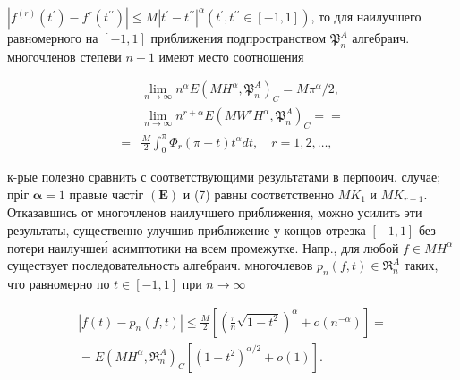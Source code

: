 \documentclass[10pt]{article}
\begin{document}
$\left|f^{(r)}\left(t^{\prime}\right)-f^{r}\left(t^{\prime \prime}\right)\right| \leqslant M\left|t^{\prime}-t^{\prime \prime}\right|^{\alpha}\left(t^{\prime}, t^{\prime \prime} \in[-1,1]\right)$, то для наилучшего равномерного на $[-1,1]$ приближения подпространством $\mathfrak{P}_{n}^{A}$ алгебраич. многочленов степеви $n-1$ имеют место соотношения



\[

\begin{aligned}

& \lim _{n \rightarrow \infty} n^{\alpha} E\left(M H^{\alpha}, \mathfrak{P}_{n}^{A}\right)_{C}=M \pi^{\alpha} / 2, \\

& \lim _{n \rightarrow \infty} n^{r+\alpha} E\left(M W^{r} H^{\alpha}, \mathfrak{P}_{n}^{A}\right)_{C}== \\

= & \frac{M}{2} \int_{0}^{\pi} \Phi_{r}(\pi-t) t^{\alpha} d t, \quad r=1,2, \ldots,

\end{aligned}

\]



к-рые полезно сравнить с соответствующими результатами в перпооич. случае; пріг $\boldsymbol{\alpha}=1$ правые частіг $(\boldsymbol{E})$ и (7) равны соответственно $M K_{1}$ и $M K_{r+1}$. Отказавшись от многочленов наилучшего приближения, можно усилить эти результаты, существенно улучшив приближение у концов отрезка $[-1,1]$ без потери наилучшеи́ асимптотики на всем промежутке. Напр., для любой $f \in M H^{\alpha}$ существует последовательность алгебраич. многочлевов $p_{n}(f, t) \in \mathfrak{R}_{n}^{A}$ таких, что равномерно по $t \in[-1,1]$ при $n \rightarrow \infty$



\[

\begin{gathered}

\left|f(t)-p_{n}(f, t)\right| \leqslant \frac{M}{2}\left[\left(\frac{\pi}{n} \sqrt{1-t^{2}}\right)^{\alpha}+o\left(n^{-\alpha}\right)\right]= \\

=E\left(M H^{\alpha}, \mathfrak{R}_{n}^{A}\right)_{C}\left[\left(1-t^{2}\right)^{\alpha / 2}+o(1)\right] .

\end{gathered}

\]
\end{document}
